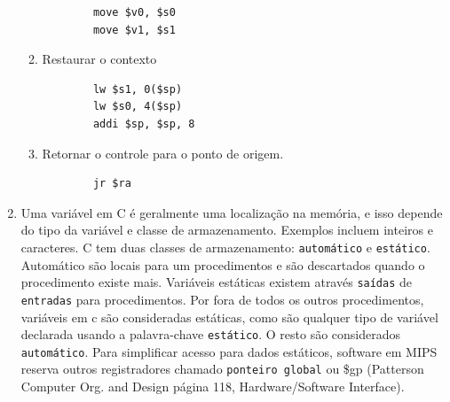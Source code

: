 \documentclass{article}
\begin{document}
\begin{enumerate}
\begin{enumerate}
      \begin{verbatim}
        move $v0, $s0
        move $v1, $s1
      \end{verbatim}

    \item Restaurar o contexto

      \begin{verbatim}
        lw $s1, 0($sp)
        lw $s0, 4($sp)
        addi $sp, $sp, 8
      \end{verbatim}

    \item Retornar o controle para o ponto de origem.

      \begin{verbatim}
        jr $ra
      \end{verbatim}

  \end{enumerate}

  \item Uma variável em C é geralmente uma localização na memória, e isso
  depende do tipo da variável e classe de armazenamento. Exemplos incluem
  inteiros e caracteres. C tem duas classes de armazenamento: \verb|automático|
  e \verb|estático|. Automático são locais para um procedimentos e são
  descartados quando o procedimento existe mais. Variáveis estáticas existem
  através \verb|saídas| de \verb|entradas| para procedimentos. Por fora de
  todos os outros procedimentos, variáveis em c são consideradas estáticas,
  como são qualquer tipo de variável declarada usando a palavra-chave
  \verb|estático|. O resto são considerados \verb|automático|. Para simplificar
  acesso para dados estáticos, software em MIPS reserva outros registradores
  chamado \verb|ponteiro global| ou  \$gp (Patterson Computer Org. and Design
  página 118, Hardware/Software Interface).

\end{enumerate}
\end{document}
